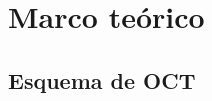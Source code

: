 



\section{Marco teórico}
\label{sec:marco_teorico}
\subsection{Esquema de OCT}
\label{sec:OCT_Esquema}

